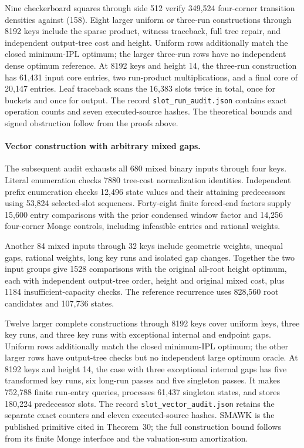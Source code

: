 \documentclass[11pt]{article}
\begin{document}
Nine checkerboard squares through side 512 verify 349,524 four-corner
transition densities against (158). Eight larger
uniform or three-run constructions through 8192 keys include the sparse
product, witness traceback, full tree repair, and independent output-tree
cost and height. Uniform rows additionally match the closed minimum-IPL
optimum; the larger three-run rows have no independent dense optimum
reference. At 8192 keys and height 14, the three-run construction has
61,431 input core entries, two run-product multiplications, and a final
core of 20,147 entries. Leaf traceback scans the 16,383 slots twice in
total, once for buckets and once for output. The record
\texttt{slot\_run\_audit.json} contains exact operation counts and seven
executed-source hashes. The theoretical bounds and signed obstruction
follow from the proofs above.


\paragraph{Vector construction with arbitrary mixed gaps.}
The subsequent audit exhausts all 680 mixed binary inputs through four
keys. Literal enumeration checks 7880 tree-cost normalization identities.
Independent prefix enumeration checks 12,496 state values and their
attaining predecessors using 53,824 selected-slot sequences. Forty-eight
finite forced-end factors supply 15,600 entry comparisons with the prior
condensed window factor and 14,256 four-corner Monge controls, including
infeasible entries and rational weights.

Another 84 mixed inputs through 32 keys include geometric weights,
unequal gaps, rational weights, long key runs and isolated gap changes.
Together the two input groups give 1528 comparisons with the original
all-root height optimum, each with independent output-tree order, height
and original mixed cost, plus 1184 insufficient-capacity checks. The
reference recurrence uses 828,560 root candidates and 107,736 states.

Twelve larger complete constructions through 8192 keys cover uniform keys,
three key runs, and three key runs with exceptional internal and endpoint
gaps. Uniform rows additionally match the closed minimum-IPL optimum;
the other larger rows have output-tree checks but no independent large
optimum oracle. At 8192 keys and height 14, the case with three exceptional
internal gaps has five transformed key runs, six long-run passes and five
singleton passes. It makes 752,788 finite run-entry queries, processes
61,437 singleton states, and stores 180,224 predecessor slots. The record
\texttt{slot\_vector\_audit.json} retains the separate exact counters and
eleven executed-source hashes. SMAWK is the published primitive cited in
Theorem~30; the full construction bound follows from
its finite Monge interface and the valuation-sum amortization.
\end{document}
